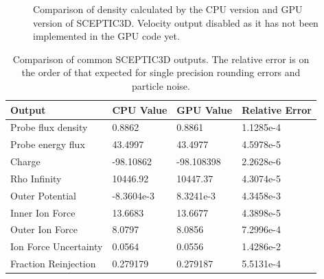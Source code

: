 \begin{figure}
\centering
\noindent
	\caption[GPU Validation: Particle Flux Comparison]{Comparison of density calculated by the CPU version and GPU version of SCEPTIC3D. Velocity output disabled as it has not been implemented in the GPU code yet.}	
	\label{fig:gpu_validation_density}
\end{figure}



\begin{table}
\begin{tabular}{| p{4.0cm} | p{3.5cm} | p{2.5cm} | p{4.0cm} |}
\hline
Output 						& CPU Value 		& GPU Value 		& Relative Error \\ \hline
Probe flux density 		& 0.8862 			& 0.8861 			& 1.1285e-4 \\ \hline
Probe energy flux   		& 43.4997 			& 43.4977 			& 4.5978e-5 \\ \hline
Charge 						& -98.10862 		& -98.108398 		& 2.2628e-6 \\ \hline
Rho Infinity 				& 10446.92 			& 10447.37 			& 4.3074e-5 \\ \hline
Outer Potential 			& -8.3604e-3 		& 8.3241e-3 		& 4.3458e-3 \\ \hline
Inner Ion Force 			& 13.6683 			& 13.6677 			& 4.3898e-5 \\ \hline
Outer Ion Force 			& 8.0797 			& 8.0856 			& 7.2996e-4 \\ \hline
Ion Force Uncertainty 	& 0.0564 			& 0.0556 			& 1.4286e-2 \\ \hline
Fraction Reinjection 	& 0.279179			& 0.279187 			& 5.5131e-4 \\ \hline
\end{tabular}
\caption[CPU and GPU SCEPTIC3D Output Comparison]{Comparison of common SCEPTIC3D outputs. The relative error is on the order of that expected for single precision rounding errors and particle noise.}
\label{tab:cpu_gpu_data_compare} 
\end{table}

